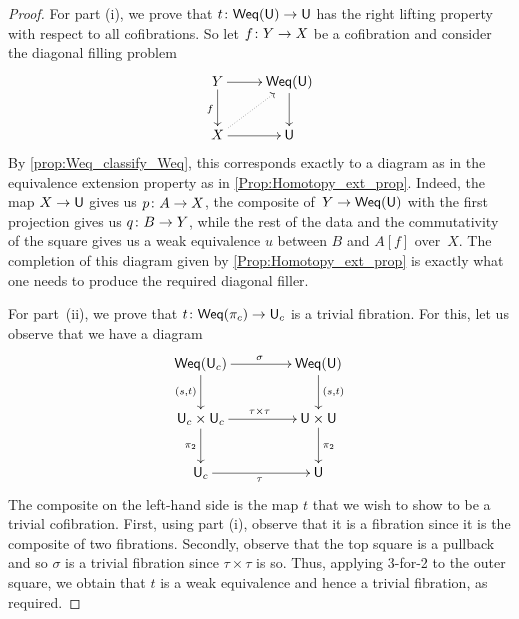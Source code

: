 \documentclass[reqno,10pt,a4paper,oneside,draft]{amsart}
\begin{document}
\begin{proof} For part (i), we prove that $t \colon  \mathsf{Weq}(\mathsf{U}) \to \mathsf{U}$ has the right lifting property with respect
to all cofibrations. So let $f \colon Y \rightarrow X$ be a cofibration and consider the diagonal
filling problem
\[
\xymatrix{Y \ar[d]_f \ar[r] & \mathsf{Weq}(\U) \ar[d] \\
X \ar[r] \ar@{.>}[ur]  & \U 
}
\]
By  \cref{prop:Weq_classify_Weq}, this corresponds exactly to a diagram as in the equivalence extension property as in \cref{Prop:Homotopy_ext_prop}. Indeed, the map $X \rightarrow \mathsf{U}$ gives us
$p \colon A \to X$, the composite of~$Y \rightarrow  \mathsf{Weq}(\mathsf{U})$ with the first projection
gives us $q \colon B \to Y$, while the rest of the data and the commutativity of the square 
gives us a weak equivalence $u$ between $B$ and $A[f]$ over~$X$. The completion of this diagram given by \cref{Prop:Homotopy_ext_prop} is exactly what one needs to produce the required diagonal filler.

For part~(ii), we prove that $t \colon \mathsf{Weq}(\pi_c) \to \mathsf{U}_c$ is a trivial fibration. For this, let us
observe that we have a diagram 
\[
\xymatrix@C=1.5cm{
\Weq(\U_c) \ar[r]^{\sigma}  \ar[d]_{(s,t)} & \Weq(\U) \ar[d]^{(s,t)} \\
\U_c \times \U_c \ar[r]^{\tau \times \tau} \ar[d]_{\pi_2} & \U \times \U \ar[d]^{\pi_2} \\
\U_c \ar[r]_\tau & \U }
\]
The composite  on the left-hand side is the map $t$ that we wish to show to be a trivial cofibration.
First, using part (i), observe that it is a fibration since it is the composite of two fibrations. Secondly,
observe that the top square is a pullback and so $\sigma$ is a trivial fibration since $\tau \times \tau$ 
is so. Thus, applying 3-for-2 to the outer square, we obtain that $t$ is a weak equivalence and hence
a trivial fibration, as required.
\end{proof} 















\end{document}
